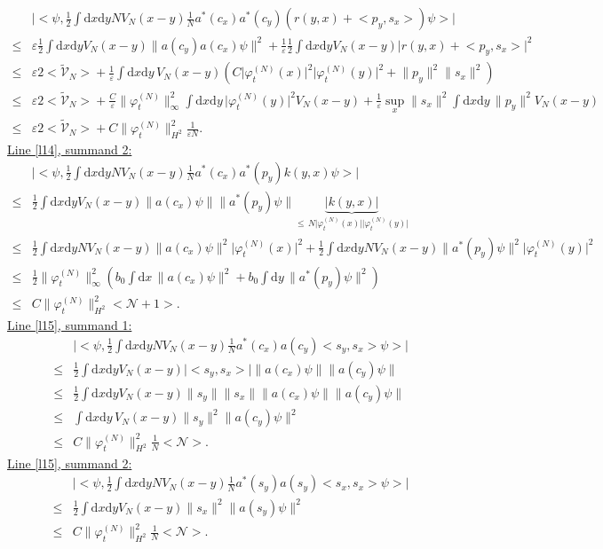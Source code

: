 \documentclass[11pt,a4paper]{scrartcl}
\newcommand{\di}{\textrm{d}}		%
\newcommand{\Ncal}{\mathcal{N}}		%
\newcommand{\tilV}{\tilde{\mathcal{V}}_N}		%
\newcommand{\estlist}[2]{\underline{Line \ref{l#1}, summand #2:}}
\newcommand{\scal}[2]{\big<#1,#2\big>} %
\newcommand{\norm}[1]{\lVert#1\rVert}	%
\newcommand{\ev}[1]{\big<#1\big>}	%
\newcommand{\ph}{\varphi_t^{(N)}}	%
\newcommand{\dxyNV}{\frac{1}{2}\int \di x\di y N V_N(x-y)} %
\newcommand{\dxyV}{\frac{1}{2}\int \di x\di y V_N(x-y)} %
\begin{document}
\begin{align*}
& \lvert \scal{\psi}{\dxyNV \frac{1}{N}a^\ast(c_x) a^\ast(c_y) \left( r(y,x)+\scal{p_y}{s_x} \right)\psi} \rvert \\
\leq & \varepsilon \dxyV \norm{a(c_y)a(c_x)\psi}^2 + \frac{1}{\varepsilon} \dxyV \lvert r(y,x)+\scal{p_y}{s_x} \rvert^2 \\
\leq & \varepsilon 2\ev{\tilV} + \frac{1}{\varepsilon} \int \di x\di y\, V_N(x-y) \left( C\lvert\ph(x)\rvert^2\lvert\ph(y)\rvert^2 +\norm{p_y}^2\norm{s_x}^2 \right) \\
\leq & \varepsilon 2\ev{\tilV} + \frac{C}{\varepsilon} \norm{\ph}_\infty^2 \int \di x \di y\, \lvert \ph(y)\rvert^2 V_N(x-y) + \frac{1}{\varepsilon} \sup_x\norm{s_x}^2 \int \di x\di y\, \norm{p_y}^2 V_N(x-y) \\
\leq & \varepsilon 2\ev{\tilV} + C\norm{\ph}_{H^2}^2 \frac{1}{\varepsilon N}.
\end{align*}
\estlist{14}{2}
\begin{align*}
& \lvert \scal{\psi}{\dxyNV \frac{1}{N} a^\ast(c_x) a^\ast(p_y) k(y,x)\psi} \rvert \\
\leq & \dxyV \norm{a(c_x)\psi} \norm{a^\ast(p_y)\psi} \underbrace{\lvert k(y,x)\rvert}_{\leq\, N\lvert \ph(x)\rvert\lvert \ph(y)\rvert} \\
\leq & \dxyNV \norm{a(c_x)\psi}^2 \lvert\ph(x)\rvert^2 + \dxyNV \norm{a^\ast(p_y)\psi}^2 \lvert \ph(y)\rvert^2\\
\leq & \frac{1}{2} \norm{\ph}_\infty^2 \left( b_0 \int \di x\,\norm{a(c_x)\psi}^2 + b_0 \int \di y\,\norm{a^\ast(p_y)\psi}^2 \right) \\
\leq & C \norm{\ph}_{H^2}^2 \ev{\Ncal+1}.
\end{align*}
\estlist{15}{1}
\begin{align*}
& \lvert \scal{\psi}{\dxyNV \frac{1}{N}a^\ast(c_x)a(c_y) \scal{s_y}{s_x}\psi} \rvert \\
\leq & \dxyV \lvert \scal{s_y}{s_x}\rvert \norm{a(c_x)\psi} \norm{a(c_y)\psi} \\
\leq & \dxyV \norm{s_y} \norm{s_x} \norm{a(c_x)\psi} \norm{a(c_y)\psi} \\
\leq & \int \di x \di y\, V_N(x-y) \norm{s_y}^2 \norm{a(c_y)\psi}^2 \\
\leq & C \norm{\ph}_{H^2}^2 \frac{1}{N}\ev{\Ncal}. 
\end{align*}
\estlist{15}{2}
\begin{align*}
& \lvert \scal{\psi}{\dxyNV \frac{1}{N}a^\ast(s_y)a(s_y)\scal{s_x}{s_x}\psi} \rvert \\
\leq & \dxyV \norm{s_x}^2 \norm{a(s_y)\psi}^2 \\
\leq & C \norm{\ph}_{H^2}^2 \frac{1}{N}\ev{\Ncal}.
\end{align*}
\end{document}
